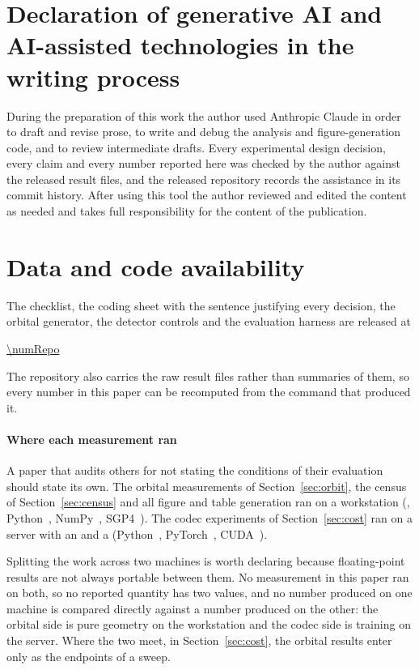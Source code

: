 \documentclass[preprint,11pt,3p]{elsarticle}
\begin{document}
\section*{Declaration of generative AI and AI-assisted technologies in the writing process}

During the preparation of this work the author used Anthropic Claude in order to draft and revise
prose, to write and debug the analysis and figure-generation code, and to review intermediate
drafts. Every experimental design decision, every claim and every number reported here was
checked by the author against the released result files, and the released repository records the
assistance in its commit history. After using this tool the author reviewed and edited the
content as needed and takes full responsibility for the content of the publication.

\section*{Data and code availability}

The checklist, the coding sheet with the sentence justifying every decision, the orbital
generator, the detector controls and the evaluation harness are released at
\begin{center}\url{\numRepo}\end{center}
\noindent The repository also carries the raw result files rather than summaries of them, so
every number in this paper can be recomputed from the command that produced it.

\paragraph{Where each measurement ran}
A paper that audits others for not stating the conditions of their evaluation should state its
own. The orbital measurements of Section~\ref{sec:orbit}, the census of
Section~\ref{sec:census} and all figure and table generation ran on a workstation
(\numWsCpu, Python~\numWsPy, NumPy~\numWsNumpy, SGP4~\numWsSgp). The codec experiments of
Section~\ref{sec:cost} ran on a server with an \numGpuCpu{} and a \numGpuName{}
(Python~\numGpuPy, PyTorch~\numTorch, CUDA~\numCuda).

Splitting the work across two machines is worth declaring because floating-point results are not
always portable between them. No measurement in this paper ran on both, so no reported quantity
has two values, and no number produced on one machine is compared directly against a number
produced on the other: the orbital side is pure geometry on the workstation and the codec side is
training on the server. Where the two meet, in Section~\ref{sec:cost}, the orbital results enter
only as the endpoints of a sweep.
\end{document}
